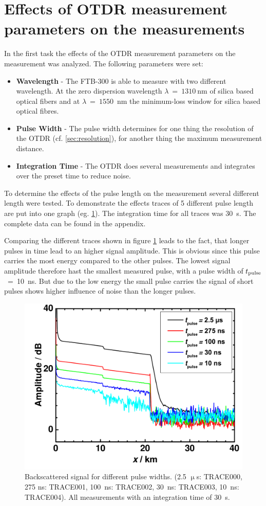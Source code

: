 \section{Effects of OTDR measurement parameters on the measurements}
In the first task the effects of the OTDR measurement parameters on the measurement was analyzed. 
The following parameters were set:
\begin{itemize}
	\item \textbf{Wavelength} - The FTB-300 is able to measure with two different wavelength. At the zero dispersion wavelength $\lambda ~=~1310~$nm  of silica based optical fibers and at $\lambda~=~1550$~nm the minimum-loss window for silica based optical fibres.
	\item \textbf{Pulse Width} - The pulse width determines for one thing the resolution of the OTDR (cf. \ref{sec:resolution}), for another thing the maximum measurement distance. 
	\item \textbf{Integration Time} - The OTDR does several measurements and integrates over the preset time to reduce noise. 
\end{itemize}

To determine the effects of the pulse length on the measurement several different length were tested. To demonstrate the effects traces of 5 different pulse length are put into one graph (eg. \ref{fig:1_time}). The integration time for all traces was 30~s. The complete data can be found in the appendix.

Comparing the different traces shown in figure \ref{fig:1_time} leads to the fact, that longer pulses in time lead to an higher signal amplitude. This is obvious since this pulse carries the most energy compared to the other pulses. 
The lowest signal amplitude therefore hast the smallest measured pulse, with a pulse width of $t_{\mathrm{pulse}}$~=~10~ns. But due to the low energy the small pulse carries the signal of short pulses shows higher influence of noise than the longer pulses. 


\begin{figure}[h]%
\centering
\includegraphics[width=.6\columnwidth]{grafiken/1_time.pdf}%
\caption{Backscattered signal for different pulse widths. (2.5 $\upmu$s: TRACE000, 275 ns: TRACE001, 100~ns: TRACE002, 30~ns: TRACE003, 10~ns: TRACE004). All measurements with an integration time of 30~s.}%
\label{fig:1_time}%
\end{figure}
\newpage

